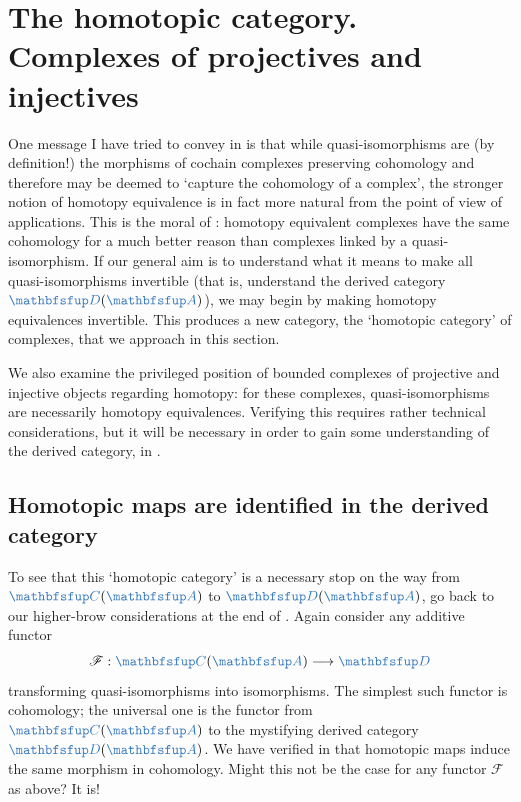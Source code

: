 \section{The homotopic category. Complexes of projectives and
  injectives}
\label{sec:homol:the-homotopic-category-complexes-of-projectives-and}

One message I have tried to convey in
 is that while
quasi-isomorphisms are (by definition!) the morphisms of cochain
complexes preserving cohomology and therefore may be deemed to
`capture the cohomology of a complex', the stronger notion of homotopy
equivalence is in fact more natural from the point of view of
applications. This is the moral of : homotopy
equivalent complexes have the same cohomology for a much better reason
than complexes linked by a quasi-isomorphism. If our general aim is to
understand what it means to make all quasi-isomorphisms invertible
(that is, understand the derived category $\categ{D}(\categ{A})$), we
may begin by making homotopy equivalences invertible. This produces a
new category, the `homotopic category' of complexes, that we approach
in this section.

We also examine the privileged position of bounded complexes of
projective and injective objects regarding homotopy: for these
complexes, quasi-isomorphisms are necessarily homotopy equivalences.
Verifying this requires rather technical considerations, but it will
be necessary in order to gain some understanding of the derived
category, in
.

\subsection{Homotopic maps are identified in the derived category}
\label{subsec:homol:homotopic-maps-are-identified-in-the-derived-category}

To see that this `homotopic category' is a necessary stop on the way
from $\categ{C}(\categ{A})$ to $\categ{D}(\categ{A})$, go back to our
higher-brow considerations at the end of
. Again
consider any additive functor
\[
  \mathscr{F} : \categ{C}(\categ{A}) \longrightarrow \categ{D}
\]
transforming quasi-isomorphisms into isomorphisms. The simplest such
functor is cohomology; the universal one is the functor from
$\categ{C}(\categ{A})$ to the mystifying derived category
$\categ{D}(\categ{A})$. We have verified in  that
homotopic maps induce the same morphism in cohomology. Might this not
be the case for any functor $\mathscr{F}$ as above? It is!

